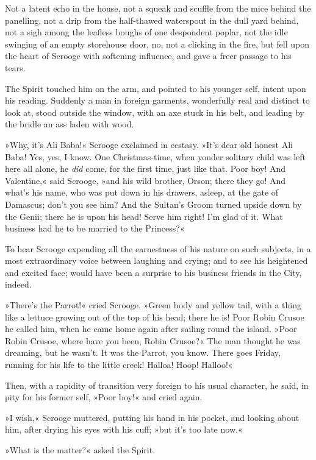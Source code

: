 Not a latent echo in the house, not a squeak and scuffle from the mice behind the panelling, not a drip from the half-thawed waterspout in the dull yard behind, not a sigh among the leafless boughs of one despondent poplar, not the idle swinging of an empty storehouse door, no, not a clicking in the fire, but fell upon the heart of Scrooge with softening influence, and gave a freer passage to his tears.

The Spirit touched him on the arm, and pointed to his younger self, intent upon his reading. Suddenly a man in foreign garments, wonderfully real and distinct to look at, stood outside the window, with an axe stuck in his belt, and leading by the bridle an ass laden with wood.

»Why, it's Ali Baba!« Scrooge exclaimed in ecstasy. »It's dear old honest Ali Baba! Yes, yes, I know. One Christmas-time, when yonder solitary child was left here all alone, he \textit{did} come, for the first time, just like that. Poor boy! And Valentine,« said Scrooge, »and his wild brother, Orson; there they go! And what's his name, who was put down in his drawers, asleep, at the gate of Damascus; don't you see him? And the Sultan's Groom turned upside down by the Genii; there he is upon his head! Serve him right! I'm glad of it. What business had he to be married to the Princess?«

To hear Scrooge expending all the earnestness of his nature on such subjects, in a most extraordinary voice between laughing and crying; and to see his heightened and excited face; would have been a surprise to his business friends in the City, indeed.

»There's the Parrot!« cried Scrooge. »Green body and yellow tail, with a thing like a lettuce growing out of the top of his head; there he is! Poor Robin Crusoe he called him, when he came home again after sailing round the island. »Poor Robin Crusoe, where have you been, Robin Crusoe?« The man thought he was dreaming, but he wasn't. It was the Parrot, you know. There goes Friday, running for his life to the little creek! Halloa! Hoop! Halloo!«

Then, with a rapidity of transition very foreign to his usual character, he said, in pity for his former self, »Poor boy!« and cried again.

»I wish,« Scrooge muttered, putting his hand in his pocket, and looking about him, after drying his eyes with his cuff; »but it's too late now.«

»What is the matter?« asked the Spirit.

